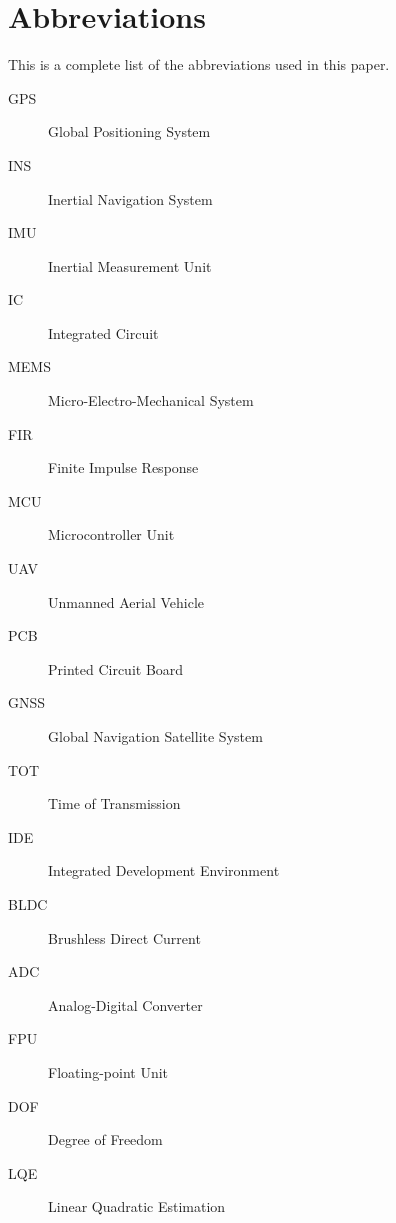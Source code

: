 \chapter*{Abbreviations}
This is a complete list of the abbreviations used in this paper.
\begin{description}
	\item[GPS] Global Positioning System
	\item[INS] Inertial Navigation System
	\item[IMU] Inertial Measurement Unit
	\item[IC] Integrated Circuit
	\item[MEMS] Micro-Electro-Mechanical System
	\item[FIR] Finite Impulse Response
	\item[MCU] Microcontroller Unit
	\item[UAV] Unmanned Aerial Vehicle
	\item[PCB] Printed Circuit Board
	\item[GNSS] Global Navigation Satellite System
	\item[TOT] Time of Transmission
	\item[IDE] Integrated Development Environment
	\item[BLDC] Brushless Direct Current
	\item[ADC] Analog-Digital Converter
	\item[FPU] Floating-point Unit
	\item[DOF] Degree of Freedom
	\item[LQE] Linear Quadratic Estimation
\end{description}